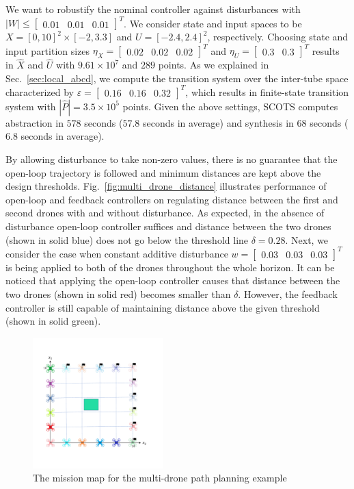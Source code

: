  We want to robustify the nominal controller against disturbances with $|W|\leq \begin{bmatrix}0.01&0.01&0.01\end{bmatrix}^T$. We consider state and input spaces to be $X=[0,10]^2\times[-2,3.3]$ and
$U=[-2.4,2.4]^2$, respectively. Choosing state and input partition sizes $\eta_{X}=\begin{bmatrix}0.02&0.02&0.02\end{bmatrix}^T$ and
$\eta_{U}=\begin{bmatrix}0.3&0.3\end{bmatrix}^T$ results in $\hat X$ and $\hat U$ with $9.61\times 10^7$ and $289$ points. As we explained in Sec.~\ref{sec:local_abcd}, we compute the transition system over the inter-tube space characterized by $\varepsilon=\begin{bmatrix}0.16&0.16&0.32\end{bmatrix}^T$, which results in finite-state transition system with $|\hat P|=3.5\times 10^5$ points. Given the above settings, SCOTS computes abstraction in $578$ seconds ($57.8$ seconds in average) and synthesis in $68$ seconds ($6.8$ seconds in average).

By allowing disturbance to take non-zero values, there is no guarantee that the open-loop trajectory is followed and minimum distances are kept above the design thresholds. Fig.~\ref{fig:multi_drone_distance} illustrates performance of open-loop and feedback controllers on regulating distance between the first and second drones %
with and without disturbance. As expected, in the absence of disturbance open-loop controller suffices and distance between the two drones (shown in solid blue) does not go below the threshold line $\delta=0.28$. Next, we consider the case when constant additive disturbance $w=\begin{bmatrix}0.03&0.03&0.03\end{bmatrix}^T$ is being applied to both of the drones throughout the whole horizon. It can be noticed that applying the open-loop controller causes that distance between the two drones (shown in solid red) becomes smaller than $\delta$. However, the feedback controller is still capable of maintaining distance above the given threshold (shown in solid green).
\begin{figure}[t]
	\centering
	\includegraphics[width=0.45\textwidth]{figures/MA1.pdf}
	\caption{The mission map for the multi-drone path planning example}
\end{figure}\label{fig:MA}


